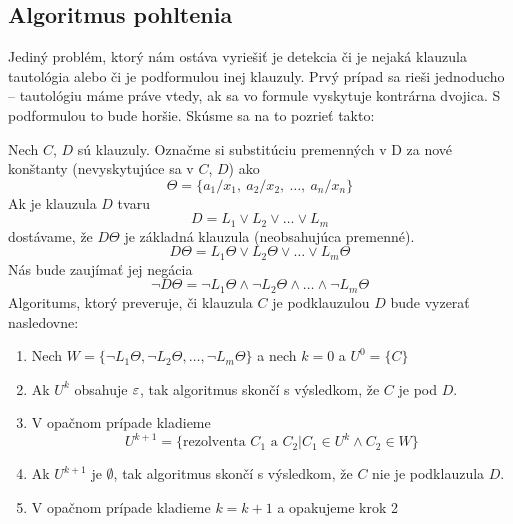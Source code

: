 \subsection{Algoritmus  pohltenia}
Jediný problém, ktorý nám ostáva vyriešiť je detekcia či je nejaká
klauzula tautológia alebo či je podformulou inej klauzuly. Prvý prípad
sa rieši jednoducho -- tautológiu máme práve vtedy, ak sa vo formule
vyskytuje kontrárna dvojica. S podformulou to bude horšie.
Skúsme sa na to pozrieť takto:

Nech $C$, $D$ sú klauzuly. Označme si substitúciu premenných v D za
nové konštanty (nevyskytujúce sa v $C$, $D$) ako
\begin{equation*}
    \Theta = \{ a_1 / x_1,\ a_2 / x_2,\ \ldots,\ a_n / x_n \}
\end{equation*}
%
Ak je klauzula $D$ tvaru
\begin{equation*}
    D = L_1 \lor L_2 \lor \ldots \lor L_m
\end{equation*}
dostávame, že $D\Theta$ je základná klauzula (neobsahujúca premenné).
%
\begin{equation*}
    D \Theta = L_1\Theta \lor L_2 \Theta \lor \ldots \lor L_m \Theta
\end{equation*}
%
Nás bude zaujímať jej negácia
\begin{equation*}
\neg D\Theta = \neg L_1 \Theta \land \neg L_2 \Theta 
                \land \ldots \land \neg L_m \Theta
\end{equation*}
%
Algoritums, ktorý preveruje, či klauzula $C$ je podklauzulou $D$ bude
vyzerať nasledovne:

\begin{enumerate}
    \item Nech 
        $W = \{ \neg L_1 \Theta, \neg L_2 \Theta, \ldots, \neg L_m \Theta \}$
        a nech $k=0$ a $U^0 = \{ C \}$

    \item Ak $U^k$ obsahuje $\varepsilon$, tak algoritmus skončí
        s výsledkom, že $C$ je pod $D$.

    \item V opačnom prípade kladieme 
        \begin{equation*}
            U^{k+1} = \{ \mbox{rezolventa } C_1 \mbox{ a } C_2 | 
            C_1 \in U^{k} \land C_2 \in W\}
        \end{equation*}

    \item Ak $U^{k+1}$ je $\emptyset$, tak algoritmus skončí s
        výsledkom, že  $C$ nie je podklauzula $D$. 

    \item V opačnom prípade kladieme $k=k+1$ a opakujeme krok 2
\end{enumerate}

